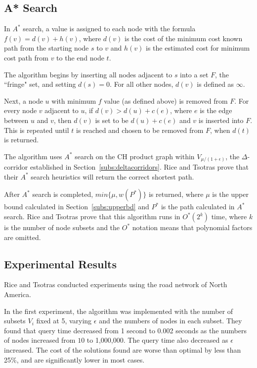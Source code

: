 \documentclass{sig-alternate}
\begin{document}
\subsection{A* Search}
\label{subs:A*}
In $A^{*}$ search, a value is assigned to each node with the formula $f(v)=d(v)+h(v)$, where $d(v)$ is the cost of the minimum cost known path from the starting node $s$ to $v$ and $h(v)$ is the estimated cost for minimum cost path from $v$ to the end node $t$. 

The algorithm begins by inserting all nodes adjacent to $s$ into a set $F$, the ``fringe" set, and setting $d(s)=0$. For all other nodes, $d(v)$ is defined as $\infty$.

Next, a node $u$ with minimum $f$ value (as defined above) is removed from $F$. For every node $v$ adjacent to $u$, if $d(v) > d(u) + c(e)$, where $e$ is the edge between $u$ and $v$, then $d(v)$ is set to be $d(u) + c(e)$ and $v$ is inserted into $F$. This is repeated until $t$ is reached and chosen to be removed from $F$, when $d(t)$ is returned. 

The algorithm uses $A^{*}$ search on the CH product graph within $V_{\mu / (1+\epsilon)}$, the $\Delta$-corridor established in Section~\ref{subs:deltacorridors}. Rice and Tsotras \cite{Rice:2013} prove that their $A^{*}$ search heuristics will return the correct shortest path. 

After $A^{*}$ search is completed, $min\{\mu,w(P^{*})\}$ is returned, where $\mu$ is the upper bound calculated in Section~\ref{subs:upperbd} and $P^{*}$ is the path calculated in $A^{*}$ search. Rice and Tsotras \cite{Rice:2013} prove that this algorithm runs in $O^{*}(2^{k})$ time, where $k$ is the number of node subsets and the $O^{*}$ notation means that polynomial factors are omitted. 

\subsection{Experimental Results}
\label{subs:riceresults}
Rice and Tsotras \cite{Rice:2013} conducted experiments using the road network of North America. 

In the first experiment, the algorithm was implemented with the number of subsets $V_{i}$ fixed at 5, varying $\epsilon$ and the numbers of nodes in each subset. They found that query time decreased from 1 second to 0.002 seconds as the numbers of nodes increased from $10$ to 1,000,000. The query time also decreased as $\epsilon$ increased. The cost of the solutions found are worse than optimal by less than 25\%, and are significantly lower in most cases. 
\end{document}
